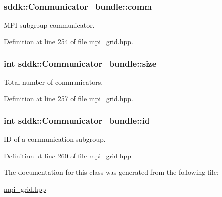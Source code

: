 \subsubsection[{comm\+\_\+}]{ sddk\+::\+Communicator\+\_\+bundle\+::comm\+\_\+\hspace{0.3cm}{\ttfamily [private]}}\label{classsddk_1_1_communicator__bundle_a52c81fdbb0adad9374a979613362c85a}


M\+P\+I subgroup communicator. 



Definition at line 254 of file mpi\+\_\+grid.\+hpp.

\hypertarget{classsddk_1_1_communicator__bundle_aa834107905e3bb6c82e7c53d78383bc8}{}
\subsubsection[{size\+\_\+}]{\setlength{\rightskip}{0pt plus 5cm}int sddk\+::\+Communicator\+\_\+bundle\+::size\+\_\+\hspace{0.3cm}{\ttfamily [private]}}\label{classsddk_1_1_communicator__bundle_aa834107905e3bb6c82e7c53d78383bc8}


Total number of communicators. 



Definition at line 257 of file mpi\+\_\+grid.\+hpp.

\hypertarget{classsddk_1_1_communicator__bundle_a18e1bc4d2ed9c860600f4f5683372808}{}
\subsubsection[{id\+\_\+}]{\setlength{\rightskip}{0pt plus 5cm}int sddk\+::\+Communicator\+\_\+bundle\+::id\+\_\+\hspace{0.3cm}{\ttfamily [private]}}\label{classsddk_1_1_communicator__bundle_a18e1bc4d2ed9c860600f4f5683372808}


I\+D of a communication subgroup. 



Definition at line 260 of file mpi\+\_\+grid.\+hpp.



The documentation for this class was generated from the following file\+:\begin{DoxyCompactItemize}
\item 
\hyperlink{mpi__grid_8hpp}{mpi\+\_\+grid.\+hpp}\end{DoxyCompactItemize}
